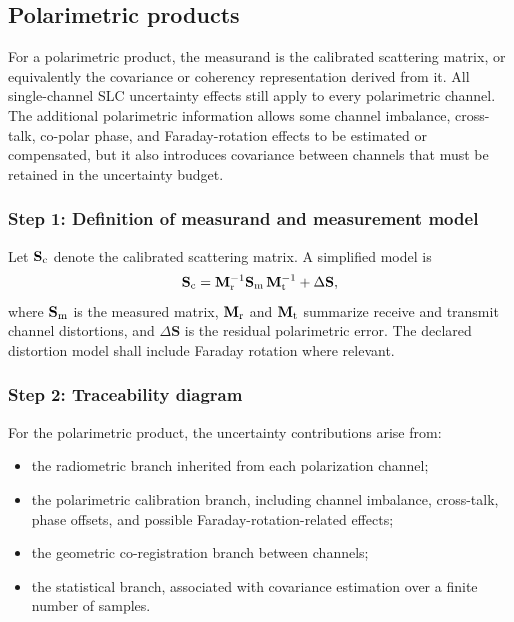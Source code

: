\subsection{Polarimetric products}

For a polarimetric product, the measurand is the calibrated scattering matrix, or equivalently the covariance or
coherency representation derived from it. All single-channel \ac{SLC} uncertainty effects still
apply to every polarimetric channel. The additional polarimetric information
allows some channel imbalance, cross-talk, co-polar phase, and Faraday-rotation
effects to be estimated or compensated, but it also introduces covariance
between channels that must be retained in the uncertainty budget.

\subsubsection{Step 1: Definition of measurand and measurement model}

Let $\mathbf{S}_{\rm c}$ denote the calibrated scattering matrix. A simplified
model is
\begin{equation}
  \mathbf{S}_{\rm c} = \mathbf{M}_{\rm r}^{-1}
  \mathbf{S}_{\rm m}\, \mathbf{M}_{\rm t}^{-1} + \Delta\mathbf{S},
  \label{eq:l1_pol_product_model}
\end{equation}
where $\mathbf{S}_{\rm m}$ is the measured matrix,
$\mathbf{M}_{\rm r}$ and $\mathbf{M}_{\rm t}$ summarize receive and transmit
channel distortions, and $\Delta\mathbf{S}$ is the residual polarimetric error. The declared distortion model shall include Faraday rotation where relevant.





\subsubsection{Step 2: Traceability diagram}

For the polarimetric product, the uncertainty contributions arise from:
\begin{itemize}
  \item the radiometric branch inherited from each polarization channel;
  \item the polarimetric calibration branch, including channel imbalance,
  cross-talk, phase offsets, and possible Faraday-rotation-related effects;
  \item the geometric co-registration branch between channels;
  \item the statistical branch, associated with covariance estimation over a
  finite number of samples.
\end{itemize}

